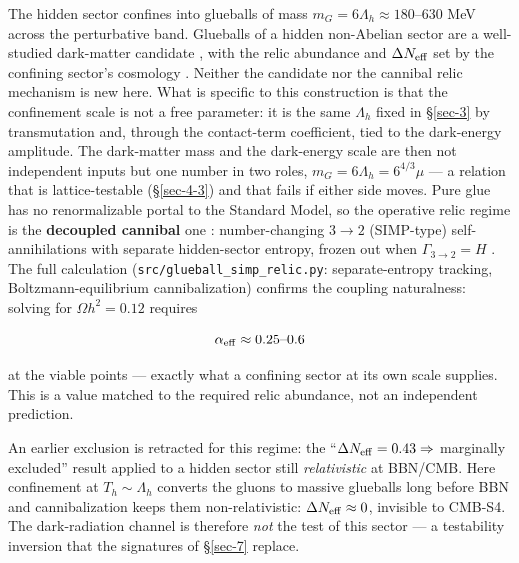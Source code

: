 \documentclass[preprint,12pt]{elsarticle}
\begin{document}
The hidden sector confines into glueballs of mass
\(m_G = 6\Lambda_h \approx 180\)--630 MeV across the perturbative band.
Glueballs of a hidden non-Abelian sector are a well-studied dark-matter
candidate
\citep{Boddy:2014yra, Soni:2016gzf, Halverson:2016nfq, Halverson:2018olu},
with the relic abundance and \(\Delta N_{\rm eff}\) set by the confining
sector's cosmology \citep{Forestell:2017wov, Carenza:2023eua}. Neither
the candidate nor the cannibal relic mechanism is new here. What is
specific to this construction is that the confinement scale is not a
free parameter: it is the same \(\Lambda_h\) fixed in §\ref{sec-3} by
transmutation and, through the contact-term coefficient, tied to the
dark-energy amplitude. The dark-matter mass and the dark-energy scale
are then not independent inputs but one number in two roles,
\(m_G = 6\Lambda_h = 6^{4/3}\mu\) --- a relation that is
lattice-testable (§\ref{sec-4-3}) and that fails if either side moves.
Pure glue has no renormalizable portal to the Standard Model, so the
operative relic regime is the \textbf{decoupled cannibal} one
\citep{Carlson:1992fn}: number-changing \(3\to2\) (SIMP-type)
self-annihilations
\citep{Hochberg:2014dra, Hochberg:2014kqa, Hochberg:2015vrg} with
separate hidden-sector entropy, frozen out when \(\Gamma_{3\to2} = H\)
\citep{Pappadopulo:2016pkp, Farina:2016llk, Kuflik:2015isi}. The full
calculation (\texttt{src/\allowbreak glueball\_\allowbreak simp\_\allowbreak relic.\allowbreak py}: separate-entropy
tracking, Boltzmann-equilibrium cannibalization) confirms the coupling
naturalness: solving for \(\Omega h^2 = 0.12\) requires

\begin{equation}\alpha_{\rm eff} \approx 0.25\text{–}0.6\end{equation}

at the viable points --- exactly what a confining sector at its own
scale supplies. This is a value matched to the required relic abundance,
not an independent prediction.

An earlier exclusion is retracted for this regime: the
``\(\Delta N_{\rm eff} = 0.43 \Rightarrow\) marginally excluded'' result
applied to a hidden sector still \emph{relativistic} at BBN/CMB. Here
confinement at \(T_h \sim \Lambda_h\) converts the gluons to massive
glueballs long before BBN and cannibalization keeps them
non-relativistic: \(\Delta N_{\rm eff} \approx 0\), invisible to CMB-S4.
The dark-radiation channel is therefore \emph{not} the test of this
sector --- a testability inversion that the signatures of §\ref{sec-7}
replace.
\end{document}
